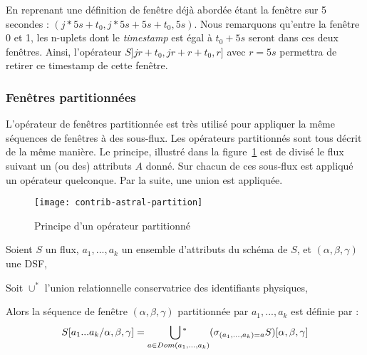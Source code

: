 \begin{example}
    En reprenant une définition de fenêtre déjà abordée étant la fenêtre sur 5 secondes : $(j*5s+t_0,j*5s+5s+t_0,5s)$. Nous remarquons qu'entre la fenêtre 0 et 1, les n-uplets dont le \textit{timestamp} est égal à $t_0+5s$ seront dans ces deux fenêtres. Ainsi, l'opérateur $S]jr+t_0,jr+r+t_0,r]$ avec $r=5s$ permettra de retirer ce timestamp de cette fenêtre.
\end{example}


\subsubsection{Fenêtres partitionnées}
L'opérateur de fenêtres partitionnée est très utilisé pour appliquer la même séquences de fenêtres à des sous-flux. Les opérateurs partitionnés sont tous décrit de la même manière. Le principe, illustré dans la figure~\ref{fig:contrib:astral:partition} est de divisé le flux suivant un (ou des) attributs $A$ donné. Sur chacun de ces sous-flux est appliqué un opérateur quelconque. Par la suite, une union est appliquée.
\begin{figure}[ht]
	\centering
	\texttt{[image: contrib-astral-partition]}
	\caption{Principe d'un opérateur partitionné}\label{fig:contrib:astral:partition}
\end{figure}
\begin{defi}
	Soient $S$ un flux, $a_1,...,a_k$ un ensemble d'attributs du schéma de $S$, et $(\alpha,\beta,\gamma)$ une DSF,
	
	Soit $\cup^*$ l'union relationnelle conservatrice des identifiants physiques, 

	Alors la séquence de fenêtre $(\alpha,\beta,\gamma)$ partitionnée par $a_1,...,a_k$ est définie par :
	$$S[a_1...a_k/\alpha,\beta,\gamma] = \mathop{\bigcup\null^*}_{a\in Dom(a_1,...,a_k)} (\sigma_{(a_1,...,a_k)=a} S)[\alpha,\beta,\gamma]$$
\end{defi}


